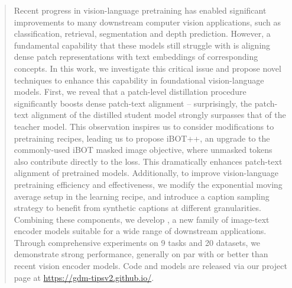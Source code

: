 \begin{abstract}
Recent progress in vision-language pretraining has enabled significant improvements to many downstream computer vision applications, such as classification, retrieval, segmentation and depth prediction. However, a fundamental capability that these models still struggle with is aligning dense patch representations with text embeddings of corresponding concepts.
In this work, we investigate this critical issue and propose novel techniques to enhance this capability in foundational vision-language models.
First, we reveal that a patch-level distillation procedure significantly boosts dense patch-text alignment -- surprisingly, the patch-text alignment of the distilled student model strongly surpasses that of the teacher model.
This observation inspires us to consider modifications to pretraining recipes, leading us to propose iBOT++, an upgrade to the commonly-used iBOT masked image objective, where unmasked tokens also contribute directly to the loss.
This dramatically enhances patch-text alignment of pretrained models.
Additionally, to improve vision-language pretraining efficiency and effectiveness, we modify the exponential moving average setup in the learning recipe, and introduce a caption sampling strategy to benefit from synthetic captions at different granularities.
Combining these components, we develop \tipsvtwo, a new family of image-text encoder models suitable for a wide range of downstream applications. 
Through comprehensive experiments on 9 tasks and 20 datasets, we demonstrate strong performance, generally on par with or better than recent vision encoder models. 
Code and models are released via our project page at \url{https://gdm-tipsv2.github.io/}.

\end{abstract}
\vspace{-13pt}
